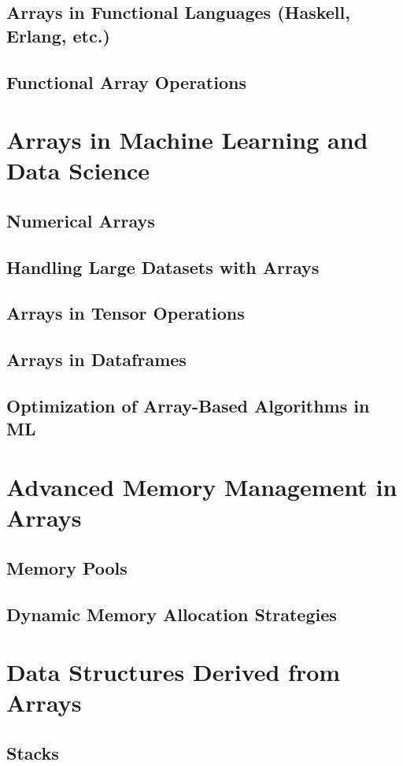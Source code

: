 \documentclass[12pt, oneside]{book}
\begin{document}
	\section{Arrays in Functional Languages (Haskell, Erlang, etc.)}
	\section{Functional Array Operations}
	
	\chapter{Arrays in Machine Learning and Data Science}
	\section{Numerical Arrays}
	\section{Handling Large Datasets with Arrays}
	\section{Arrays in Tensor Operations}
	\section{Arrays in Dataframes}
	\section{Optimization of Array-Based Algorithms in ML}
	
	\chapter{Advanced Memory Management in Arrays}
	\section{Memory Pools}
	\section{Dynamic Memory Allocation Strategies}
	
	\chapter{Data Structures Derived from Arrays}
	\section{Stacks}
\end{document}
